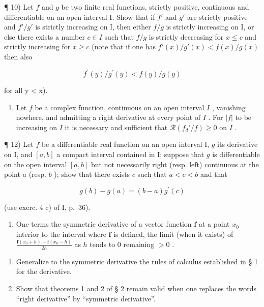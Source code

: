 ¶ 10) Let \(f\) and \(g\) be two finite real functions, strictly positive, continuous and differentiable on an open interval I. Show that if \(f'\) and \(g'\) are strictly positive and \(f'/g'\) is strictly increasing on I, then either \(f/g\) is strictly increasing on I, or else there exists a number \(c \in I\) such that \(f / g\) is strictly decreasing for \(x \leqslant c\) and strictly increasing for \(x \geqslant c\) (note that if one has \(f'(x) / g'(x) < f(x) / g(x)\) then also

\[
f ^ {\prime} (y) / g ^ {\prime} (y) <   f (y) / g (y)
\]

for all y \textless{} x).

\begin{enumerate}
\def\labelenumi{\arabic{enumi})}
\setcounter{enumi}{10}
\tightlist
\item
  Let \(f\) be a complex function, continuous on an open interval \(I\) , vanishing nowhere, and admitting a right derivative at every point of \(I\) . For \(|f|\) to be increasing on \(I\) it is necessary and sufficient that \(\mathcal{R}(f_d' / f) \geqslant 0\) on \(I\) .
\end{enumerate}

¶ 12) Let \(f\) be a differentiable real function on an open interval I, \(g\) its derivative on I, and \([a, b]\) a compact interval contained in I; suppose that \(g\) is differentiable on the open interval \([a, b]\) but not necessarily right (resp. left) continuous at the point \(a\) (resp. \(b\) ); show that there exists \(c\) such that \(a < c < b\) and that

\[
g (b) - g (a) = (b - a) g ^ {\prime} (c)
\]

(use exerc. 4 c) of I, p.~36).

\begin{enumerate}
\def\labelenumi{\arabic{enumi})}
\setcounter{enumi}{12}
\tightlist
\item
  One terms the symmetric derivative of a vector function \(\mathbf{f}\) at a point \(x_0\) interior to the interval where \(\mathbf{f}\) is defined, the limit (when it exists) of \(\frac{\mathbf{f}(x_0 + h) - \mathbf{f}(x_0 - h)}{2h}\) as \(h\) tends to 0 remaining \(>0\) .
\end{enumerate}

\begin{enumerate}
\def\labelenumi{\alph{enumi})}
\item
  Generalize to the symmetric derivative the rules of calculus established in § 1 for the derivative.
\item
  Show that theorems 1 and 2 of § 2 remain valid when one replaces the words ``right derivative'' by ``symmetric derivative''.
\end{enumerate}

